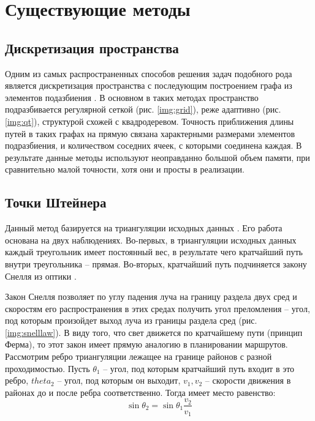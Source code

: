 \chapter{Существующие методы}

\section{Дискретизация пространства}

Одним из самых распространенных способов решения задач подобного рода является
дискретизация пространства с последующим построением графа из элементов
подазбиения \cite{GRID1, GRID2, GRID3}.
В основном в таких методах пространство подразбивается регулярной сеткой
(рис. \ref{img:grid}), реже адаптивно (рис. \ref{img:qt}), структурой схожей
с квадродеревом. Точность приближения длины путей
в таких графах на прямую связана характерными размерами элементов подразбиения,
и количеством соседних ячеек, с которыми соединена каждая.
В результате данные методы используют неоправданно большой объем памяти, при
сравнительно малой точности, хотя они и просты в реализации.


\FloatBarrier

\section{Точки Штейнера}
Данный метод базируется на триангуляции исходных данных \cite{STAINER1, STAINER2}.
Его работа основана  на двух наблюдениях. Во-первых, в триангуляции исходных
данных каждый треугольник имеет постоянный вес, в результате чего кратчайший
путь внутри треугольника -- прямая. Во-вторых, кратчайший путь подчиняется
закону Снелля из оптики \cite{SNELL}.

Закон Снелля позволяет по углу падения луча на границу раздела двух сред и
скоростям его распространения в этих средах получить угол преломления --
угол, под которым произойдет выход луча из границы раздела сред (рис. \ref{img:snelllaw}).
В виду того, что свет движется по кратчайшему пути (принцип Ферма), то этот закон
имеет прямую аналогию в планировании маршрутов.
Рассмотрим ребро триангуляции лежащее на границе районов с разной проходимостью.
Пусть $\theta_1$ -- угол, под которым кратчайший путь входит в это ребро,
$theta_2$ -- угол, под которым он выходит, $v_1, v_2$ -- скорости движения
в районах до и после ребра соответственно. Тогда имеет место равенство:
\begin{equation}
\sin\theta_2 = \sin\theta_1\frac{v_2}{v_1}
\end{equation}

